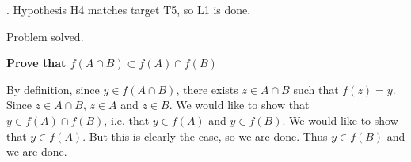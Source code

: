 \documentclass[a4paper,twoside,12pt]{article} %
\makeatletter
\DeclareRobustCommand{\_}{%
  \leavevmode\vbox{%
    \hrule\@width.4em
          \@height-.16ex
          \@depth\dimexpr.16ex+.28pt\relax}}
\newenvironment{fit}{\begin{adjustbox}{max width=\textwidth,max totalheight=\textheight,keepaspectratio}}{\end{adjustbox}}
\makeatother
\begin{document}
\begin{steps}
. Hypothesis H4 matches target T5, so L1 is done.\nopagebreak[4] 
\nopagebreak[4] 
\smallskip\nopagebreak[4] 

\begin{fit}%
\end{fit}

Problem solved.
\cleardoublepage

\end{steps}
{\begin{center} \large \textbf{Prove that $f(A \cap B) \subset f(A) \cap f(B)$}\end{center}}\nopagebreak[4]

\begin{center}
\begin{minipage}{120mm}
By definition, since $y\in f(A\cap B)$, there exists $z\in A\cap B$ such that $f(z) = y$. Since $z\in A\cap B$, $z\in A$ and $z\in B$. We would like to show that $y\in f(A)\cap f(B)$, i.e. that $y\in f(A)$ and $y\in f(B)$. We would like to show that $y\in f(A)$. But this is clearly the case, so we are done. Thus $y\in f(B)$ and we are done.
\end{minipage}
\end{center}
\end{document}
